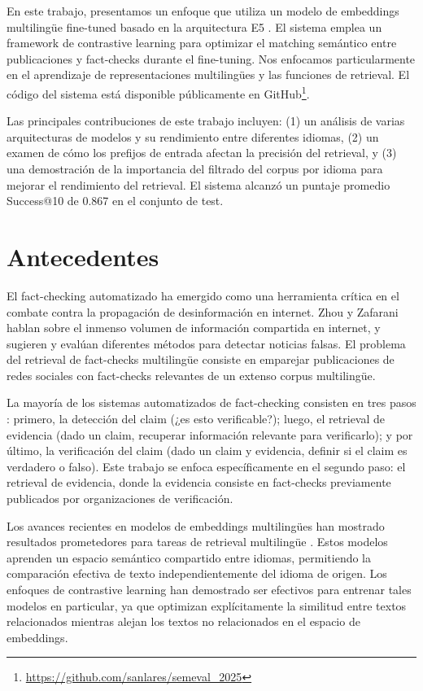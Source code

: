 \documentclass[a4paper,openany]{memoir}
\begin{document}
En este trabajo, presentamos un enfoque que utiliza un modelo de embeddings multilingüe fine-tuned basado en la arquitectura E5 \cite{wang2024multilingual}. El sistema emplea un framework de contrastive learning para optimizar el matching semántico entre publicaciones y fact-checks durante el fine-tuning. Nos enfocamos particularmente en el aprendizaje de representaciones multilingües y las funciones de retrieval. El código del sistema está disponible públicamente en GitHub\footnote{\url{https://github.com/sanlares/semeval_2025}}.

Las principales contribuciones de este trabajo incluyen: (1) un análisis de varias arquitecturas de modelos y su rendimiento entre diferentes idiomas, (2) un examen %
de cómo los prefijos de entrada afectan la precisión del retrieval, y (3) una demostración de la importancia del filtrado del corpus por idioma para mejorar el rendimiento del retrieval. El sistema alcanzó un puntaje promedio Success@10 de 0.867 en el conjunto de test.

\chapter{Antecedentes}

El fact-checking automatizado ha emergido como una herramienta crítica en el combate contra la propagación de desinformación en internet. Zhou y Zafarani \cite{zhou2020fakenews} hablan sobre el inmenso volumen de información compartida en internet, y sugieren y evalúan diferentes métodos para detectar noticias falsas. El problema del retrieval de fact-checks multilingüe consiste en emparejar publicaciones de redes sociales con fact-checks relevantes de un extenso corpus multilingüe.

La mayoría de los sistemas automatizados de fact-checking consisten en tres pasos \cite{guo2022survey}: primero, la detección del claim (¿es esto verificable?); luego, el retrieval de evidencia (dado un claim, recuperar información relevante para verificarlo); y por último, la verificación del claim (dado un claim y evidencia, definir si el claim es verdadero o falso). Este trabajo se enfoca específicamente en el segundo paso: el retrieval de evidencia, donde la evidencia consiste en fact-checks previamente publicados por organizaciones de verificación.

Los avances recientes en modelos de embeddings multilingües han mostrado resultados prometedores para tareas de retrieval multilingüe \cite{feng2022languageagnosticbertsentenceembedding, litschko2022crosslingual}. Estos modelos aprenden un espacio semántico compartido entre idiomas, permitiendo la comparación efectiva de texto independientemente del idioma de origen. Los enfoques de contrastive learning han demostrado ser efectivos para entrenar tales modelos \cite{chen2020simple} en particular, ya que optimizan explícitamente la similitud entre textos relacionados mientras alejan los textos no relacionados en el espacio de embeddings.
\end{document}

